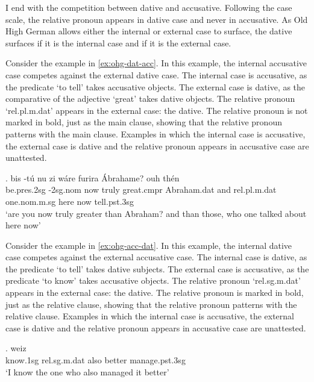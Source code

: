 I end with the competition between dative and accusative. Following the case scale, the relative pronoun appears in dative case and never in accusative. As Old High German allows either the internal or external case to surface, the dative surfaces if it is the internal case and if it is the external case.

Consider the example in \ref{ex:ohg-dat-acc}. In this example, the internal accusative case competes against the external dative case.
The internal case is accusative, as the predicate  `to tell' takes accusative objects.
The external case is dative, as the comparative of the adjective  `great' takes dative objects.
The relative pronoun  `\ac{rel}.\ac{pl}.\ac{m}.\ac{dat}' appears in the external case: the dative. The relative pronoun is not marked in bold, just as the main clause, showing that the relative pronoun patterns with the main clause.
Examples in which the internal case is accusative, the external case is dative and the relative pronoun appears in accusative case are unattested.

\exg. bis -tú nu {zi wáre} furira Ábrahame? ouh thén    \\
be.\ac{pres}.2\ac{sg} -2\ac{sg}.\ac{nom} now truly {great}.\ac{cmpr}\scsub{[dat]} Abraham.\ac{dat} and \ac{rel}.\ac{pl}.\ac{m}.\ac{dat} one.\ac{nom}.\ac{m}.\ac{sg} here now tell.\ac{pst}.3\ac{sg}\scsub{[acc]}\\
`are you now truly greater than Abraham? and than those, who one talked about here now' \label{ex:ohg-dat-acc}

Consider the example in \ref{ex:ohg-acc-dat}. In this example, the internal dative case competes against the external accusative case.
The internal case is dative, as the predicate  `to tell' takes dative subjects.
The external case is accusative, as the predicate  `to know' takes accusative objects.
The relative pronoun  `\ac{rel}.\ac{sg}.\ac{m}.\ac{dat}' appears in the external case: the dative. The relative pronoun is marked in bold, just as the relative clause, showing that the relative pronoun patterns with the relative clause.
Examples in which the internal case is accusative, the external case is dative and the relative pronoun appears in accusative case are unattested.

\exg. weiz    \\
know.1\ac{sg}\scsub{[acc]} \ac{rel}.\ac{sg}.\ac{m}.\ac{dat} also better manage.\ac{pst}.3\ac{sg}\scsub{[dat]}\\
`I know the one who also managed it better' \label{ex:ohg-acc-dat}

